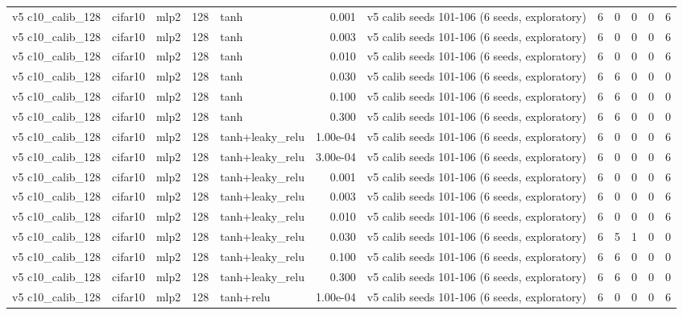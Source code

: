 \begin{table}[htbp]
{\begin{tabular}{@{}lllrlrlrrrrr@{}}
v5 c10\_calib\_128 & cifar10 & mlp2 & 128 & tanh & 0.001 & v5 calib seeds 101-106 (6 seeds, exploratory) & 6 & 0 & 0 & 0 & 6 \\
v5 c10\_calib\_128 & cifar10 & mlp2 & 128 & tanh & 0.003 & v5 calib seeds 101-106 (6 seeds, exploratory) & 6 & 0 & 0 & 0 & 6 \\
v5 c10\_calib\_128 & cifar10 & mlp2 & 128 & tanh & 0.010 & v5 calib seeds 101-106 (6 seeds, exploratory) & 6 & 0 & 0 & 0 & 6 \\
v5 c10\_calib\_128 & cifar10 & mlp2 & 128 & tanh & 0.030 & v5 calib seeds 101-106 (6 seeds, exploratory) & 6 & 6 & 0 & 0 & 0 \\
v5 c10\_calib\_128 & cifar10 & mlp2 & 128 & tanh & 0.100 & v5 calib seeds 101-106 (6 seeds, exploratory) & 6 & 6 & 0 & 0 & 0 \\
v5 c10\_calib\_128 & cifar10 & mlp2 & 128 & tanh & 0.300 & v5 calib seeds 101-106 (6 seeds, exploratory) & 6 & 6 & 0 & 0 & 0 \\
v5 c10\_calib\_128 & cifar10 & mlp2 & 128 & tanh+leaky\_relu & 1.00e-04 & v5 calib seeds 101-106 (6 seeds, exploratory) & 6 & 0 & 0 & 0 & 6 \\
v5 c10\_calib\_128 & cifar10 & mlp2 & 128 & tanh+leaky\_relu & 3.00e-04 & v5 calib seeds 101-106 (6 seeds, exploratory) & 6 & 0 & 0 & 0 & 6 \\
v5 c10\_calib\_128 & cifar10 & mlp2 & 128 & tanh+leaky\_relu & 0.001 & v5 calib seeds 101-106 (6 seeds, exploratory) & 6 & 0 & 0 & 0 & 6 \\
v5 c10\_calib\_128 & cifar10 & mlp2 & 128 & tanh+leaky\_relu & 0.003 & v5 calib seeds 101-106 (6 seeds, exploratory) & 6 & 0 & 0 & 0 & 6 \\
v5 c10\_calib\_128 & cifar10 & mlp2 & 128 & tanh+leaky\_relu & 0.010 & v5 calib seeds 101-106 (6 seeds, exploratory) & 6 & 0 & 0 & 0 & 6 \\
v5 c10\_calib\_128 & cifar10 & mlp2 & 128 & tanh+leaky\_relu & 0.030 & v5 calib seeds 101-106 (6 seeds, exploratory) & 6 & 5 & 1 & 0 & 0 \\
v5 c10\_calib\_128 & cifar10 & mlp2 & 128 & tanh+leaky\_relu & 0.100 & v5 calib seeds 101-106 (6 seeds, exploratory) & 6 & 6 & 0 & 0 & 0 \\
v5 c10\_calib\_128 & cifar10 & mlp2 & 128 & tanh+leaky\_relu & 0.300 & v5 calib seeds 101-106 (6 seeds, exploratory) & 6 & 6 & 0 & 0 & 0 \\
v5 c10\_calib\_128 & cifar10 & mlp2 & 128 & tanh+relu & 1.00e-04 & v5 calib seeds 101-106 (6 seeds, exploratory) & 6 & 0 & 0 & 0 & 6 \\

\end{tabular}}
\end{table}
